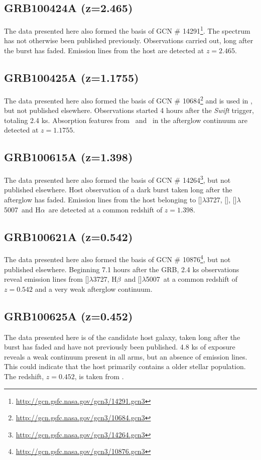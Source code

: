 \documentclass[iop, twocolappendix, numberedappendix, tighten, appendixfloats]{emulateapj}
\newcommand{\hb}{H$\beta$}
\newcommand{\ha}{H$\alpha$}
\newcommand{\oii}{[\ion{O}{2}]$\lambda$3727}
\newcommand{\oiii}{[\ion{O}{3}]$\lambda$5007}
\newcommand{\neiii}{[\ion{Ne}{3}]}
\newcommand{\feii}{\ion{Fe}{2}}
\newcommand{\mgii}{\ion{Mg}{2}}
\begin{document}
	\subsection{GRB100424A (z=2.465)}
	The data presented here also formed the basis of GCN \#
	14291\footnote{\url{http://gcn.gsfc.nasa.gov/gcn3/14291.gcn3}}. The spectrum
	has not otherwise been published previously. Observations carried out, long
	after the burst has faded.  Emission lines from the host are detected at
	$z=2.465$.

	\subsection{GRB100425A (z=1.1755)}
	The data presented here also formed the basis of GCN \#
	10684\footnote{\url{http://gcn.gsfc.nasa.gov/gcn3/10684.gcn3}} and is used in
	\citet{Skuladottir2010}, but not published elsewhere. Observations started 4
	hours after the \textit{Swift} trigger, totaling 2.4 ks. Absorption features
	from \mgii~and \feii~in the afterglow continuum are detected at $z=1.1755$.

	\subsection{GRB100615A (z=1.398)}
	The data presented here also formed the basis of GCN \#
	14264\footnote{\url{http://gcn.gsfc.nasa.gov/gcn3/14264.gcn3}}, but not
	published elsewhere. Host observation of a dark burst\citep{DElia2011} taken
	long after the afterglow has faded. Emission lines from the host belonging to
	\oii, \neiii, \oiii~and \ha~are detected at a common redshift of $z=1.398$.
	
	\subsection{GRB100621A (z=0.542)}
	The data presented here also formed the basis of GCN \#
	10876\footnote{\url{http://gcn.gsfc.nasa.gov/gcn3/10876.gcn3}}, but not
	published elsewhere. Beginning 7.1 hours after the GRB, 2.4 ks observations
	reveal emission lines from \oii, \hb~and \oiii~at a common redshift of
	$z=0.542$ and a very weak afterglow continuum.

	\subsection{GRB100625A (z=0.452)}
	The data presented here is of the candidate host galaxy, taken long after the
	burst has faded and have not previously been published. 4.8 ks of exposure
	reveals a weak continuum present in all arms, but an absence of emission lines.
	This could indicate that the host primarily contains a older stellar
	population. The redshift, $z=0.452$, is taken from \citet{Fong2013}.
\end{document}
